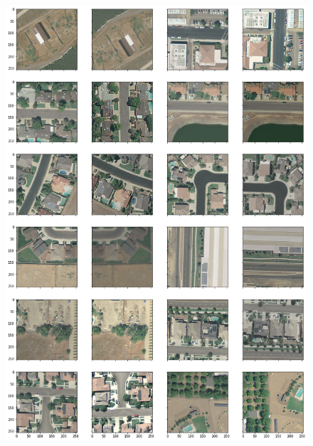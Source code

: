 \documentclass[a4paper, 12pt]{article}
\begin{document}
\begin{figure}
    \centering
    \includegraphics[width=\textwidth]{resources/png/augmentation.png}
    \label{fig:augmentation}
\end{figure}
\end{document}
